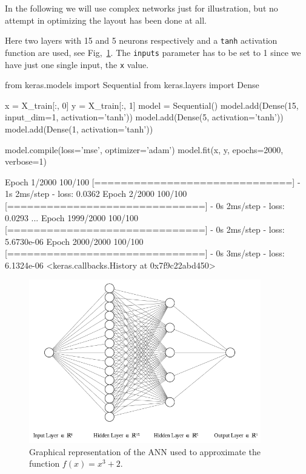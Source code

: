 In the following we will use complex networks just for illustration, but no attempt in optimizing the layout has been done at all.

Here two layers with 15 and 5 neurons respectively and a \texttt{tanh} activation function are used, see Fig,~\ref{fig:ann_1}. The \texttt{inputs} parameter has to be set to 1 since we have just one single input, the \texttt{x} value.

\begin{ipython}
from keras.models import Sequential
from keras.layers import Dense

x = X_train[:, 0]
y = X_train[:, 1]
model = Sequential()
model.add(Dense(15, input_dim=1, activation='tanh'))
model.add(Dense(5, activation='tanh'))
model.add(Dense(1, activation='tanh'))

model.compile(loss='mse', optimizer='adam')
model.fit(x, y, epochs=2000, verbose=1)
\end{ipython}
\begin{ioutput}
Epoch 1/2000
100/100 [==============================] - 1s 2ms/step - loss: 0.0362
Epoch 2/2000
100/100 [==============================] - 0s 2ms/step - loss: 0.0293
...
Epoch 1999/2000
100/100 [==============================] - 0s 2ms/step - loss: 5.6730e-06
Epoch 2000/2000
100/100 [==============================] - 0s 3ms/step - loss: 6.1324e-06
<keras.callbacks.History at 0x7f9c22abd450>
\end{ioutput}

\begin{figure}[htb]
\centering
\includegraphics[width=0.9\textwidth]{figures/ann_1.png}
\caption{Graphical representation of the ANN used to approximate the function $f(x) = x^3 + 2$.}
\label{fig:ann_1}
\end{figure}

